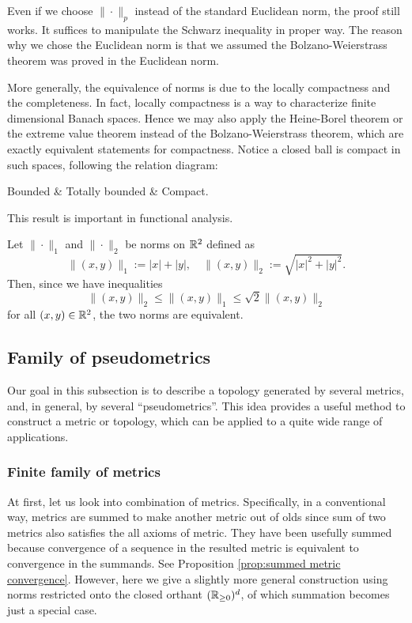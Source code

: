 \begin{rmk}
Even if we choose $\|\cdot\|_p$ instead of the standard Euclidean norm, the proof still works.
It suffices to manipulate the Schwarz inequality in proper way.
The reason why we chose the Euclidean norm is that we assumed the Bolzano-Weierstrass theorem was proved in the Euclidean norm.
\end{rmk}
\begin{rmk}
More generally, the equivalence of norms is due to the locally compactness and the completeness.
In fact, locally compactness is a way to characterize finite dimensional Banach spaces.
Hence we may also apply the Heine-Borel theorem or the extreme value theorem instead of the Bolzano-Weierstrass theorem, which are exactly equivalent statements for compactness.
Notice a closed ball is compact in such spaces, following the relation diagram:
\begin{rd}[column sep=huge]
Bounded  & Totally bounded  & Compact.
\end{rd}
This result is important in functional analysis.
\end{rmk}

\begin{ex}
Let $\|\cdot\|_1$ and $\|\cdot\|_2$ be norms on $\mathbb{R}^2$ defined as
\[\|(x,y)\|_1:=|x|+|y|,\quad\|(x,y)\|_2:=\sqrt{|x|^2+|y|^2}.\]
Then, since we have inequalities
\[\|(x,y)\|_2\le\|(x,y)\|_1\le\sqrt2\|(x,y)\|_2\]
for all $(x,y)\in\mathbb{R}^2$, the two norms are equivalent.
\end{ex}



\subsection{Family of pseudometrics}

Our goal in this subsection is to describe a topology generated by several metrics, and, in general, by several ``pseudometrics''.
This idea provides a useful method to construct a metric or topology, which can be applied to a quite wide range of applications.

\subsubsection{Finite family of metrics}
At first, let us look into combination of metrics.
Specifically, in a conventional way, metrics are summed to make another metric out of olds since sum of two metrics also satisfies the all axioms of metric.
They have been usefully summed because convergence of a sequence in the resulted metric is equivalent to convergence in the summands.
See Proposition \ref{prop:summed metric convergence}.
However, here we give a slightly more general construction using norms restricted onto the closed orthant $(\mathbb{R}_{\ge0})^d$, of which summation becomes just a special case.

